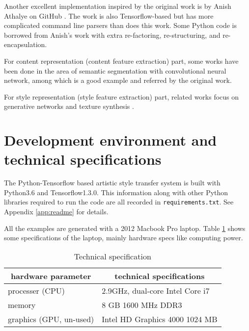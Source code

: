 Another excellent implementation inspired by the original work
is by Anish Athalye on GitHub \cite{athalye2015neuralstyle}.
The work is also Tensorflow-based but has more complicated
command line parsers than does this work.
Some Python code is borrowed from Anish's work with extra
re-factoring, re-structuring, and re-encapsulation.

For content representation (content feature extraction) part,
some works have been done in the area of semantic segmentation with convolutional neural network,
among which \cite{Long:2014um} is a good example and referred by the original work.

For style representation (style feature extraction) part,
related works focus on generative networks and texture synthesis \cite{gatys2015texture, Ulyanov:2016tw}.



\section{Development environment and technical specifications}
\label{sec:intro:spec}

The Python-Tensorflow based artistic style transfer system
is built with Python3.6 and Tensorflow1.3.0.
This information along with other Python libraries required to run the code
are all recorded in \texttt{requirements.txt}.
See Appendix \ref{app:readme} for details.

All the examples are generated with a 2012 Macbook Pro laptop.
Table \ref{table:spec} shows some specifications of the laptop,
mainly hardware specs like computing power.

    \begin{table}[!htb]
    \center
    \begin{tabular}{l|l}
    \hline
    \multicolumn{1}{c|}{hardware parameter} & \multicolumn{1}{c}{technical specifications} \\ \hline
    processer (CPU) & 2.9GHz, dual-core Intel Core i7 \\
    memory & 8 GB 1600 MHz DDR3 \\
    graphics (GPU, un-used) & Intel HD Graphics 4000 1024 MB \\
    \hline
    \end{tabular}
    \caption{Technical specification}
    \label{table:spec}
    \end{table}
